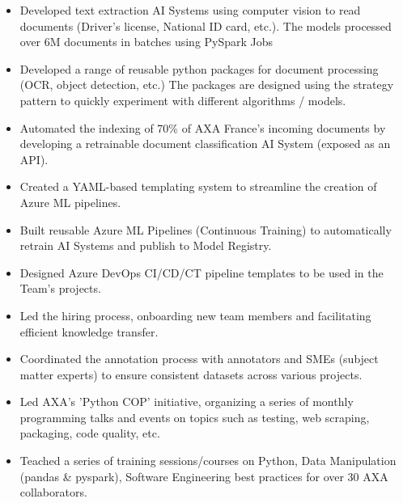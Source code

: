 \documentclass[10pt,letter,ragged2e,withhyper]{altacv}
\renewcommand{\divider}{\textcolor{body!30}{\hdashrule{\linewidth}{0.6pt}{0.5ex}}\medskip}
\begin{document}
\begin{paracol}{2}



\begin{itemize}
  \item Developed text extraction AI Systems using computer vision to read documents (Driver's license, National ID card, etc.). The models processed over 6M documents in batches using PySpark Jobs
  \item Developed a range of reusable python packages for document processing (OCR, object detection, etc.) The packages are designed using the strategy pattern to quickly experiment with different algorithms / models.
  \item Automated the indexing of 70\% of AXA France's incoming documents by developing a retrainable document classification AI System (exposed as an API).
  \item Created a YAML-based templating system to streamline the creation of Azure ML pipelines.
  \item Built reusable Azure ML Pipelines (Continuous Training) to automatically retrain AI Systems and publish to Model Registry.
  \item Designed Azure DevOps CI/CD/CT pipeline templates to be used in the Team's projects.
  \item Led the hiring process, onboarding new team members and facilitating efficient knowledge transfer.
  \item Coordinated the annotation process with annotators and SMEs (subject matter experts) to ensure consistent datasets across various projects.
  \item Led AXA's 'Python COP' initiative, organizing a series of monthly programming talks and events on topics such as testing, web scraping, packaging, code quality, etc.
  \item Teached a series of training sessions/courses on Python, Data Manipulation (pandas \& pyspark), Software Engineering best practices for over 30 AXA collaborators.
\end{itemize}

\divider
{}


\end{paracol}
\end{document}
